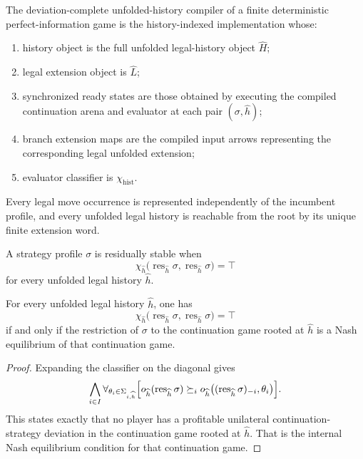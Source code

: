 \begin{definition}
\label{def:deviation-complete-history-implementation}
The deviation-complete unfolded-history compiler of a finite deterministic perfect-information game
is the history-indexed implementation whose:
\begin{enumerate}
  \item history object is the full unfolded legal-history object \(\widehat H\);
  \item legal extension object is \(\widehat L\);
  \item synchronized ready states are those obtained by executing the compiled continuation arena
  and evaluator at each pair \((\sigma,\widehat h)\);
  \item branch extension maps are the compiled input arrows representing the corresponding legal
  unfolded extension;
  \item evaluator classifier is \(\chi_{\mathrm{hist}}\).
\end{enumerate}
\end{definition}

Every legal move occurrence is represented independently of the incumbent profile, and every
unfolded legal history is reachable from the root by its unique finite extension word.

\begin{definition}
\label{def:residual-stability}
A strategy profile \(\sigma\) is residually stable when
\[
  \chi_{\widehat h}
  \bigl(
    \operatorname{res}_{\widehat h}\sigma,
    \operatorname{res}_{\widehat h}\sigma
  \bigr)
  =
  \top
\]
for every unfolded legal history \(\widehat h\).
\end{definition}

\begin{lemma}
\label{lem:continuation-equilibrium-adequacy}
For every unfolded legal history \(\widehat h\), one has
\[
  \chi_{\widehat h}
  \bigl(
    \operatorname{res}_{\widehat h}\sigma,
    \operatorname{res}_{\widehat h}\sigma
  \bigr)
  =
  \top
\]
if and only if the restriction of \(\sigma\) to the continuation game rooted at \(\widehat h\) is a
Nash equilibrium of that continuation game.
\end{lemma}

\begin{proof}
Expanding the classifier on the diagonal gives
\[
\begin{aligned}
  \bigwedge_{i\in I}
  \forall_{\theta_i\in\Sigma_{i,\widehat h}}
  \Bigl[
    o_{\widehat h}(\operatorname{res}_{\widehat h}\sigma)
    \succeq_i
    o_{\widehat h}
    \bigl(
      (\operatorname{res}_{\widehat h}\sigma)_{-i},
      \theta_i
    \bigr)
  \Bigr].
\end{aligned}
\]
This states exactly that no player has a profitable unilateral continuation-strategy deviation in
the continuation game rooted at \(\widehat h\). That is the internal Nash equilibrium condition for
that continuation game.
\end{proof}

